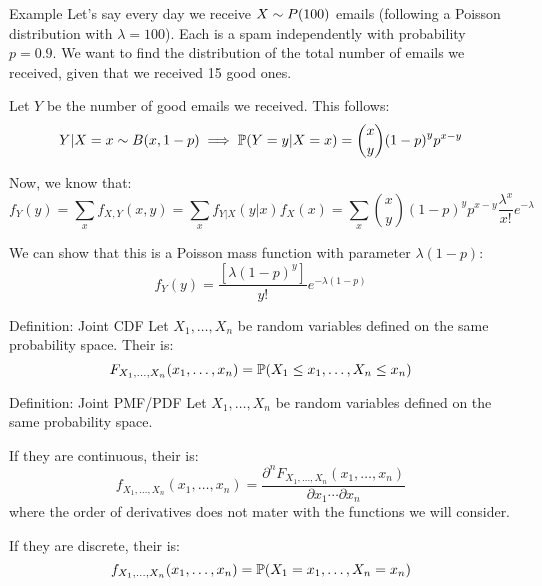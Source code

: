 \documentclass[a4paper]{article}
\begin{document}
\begin{parag}{Example}
    Let's say every day we receive $X \followsdistr P\left(100\right)$ emails (following a Poisson distribution with $\lambda = 100$). Each is a spam independently with probability $p = 0.9$. We want to find the distribution of the total number of emails we received, given that we received 15 good ones.

    Let $Y$ be the number of good emails we received. This follows: 
    \[Y | X = x \followsdistr B\left(x, 1-p\right) \implies \prob\left(Y = y | X = x\right) = \binom{x}{y} \left(1-p\right)^y p^{x-y}\]
    
    Now, we know that: 
    \[f_Y\left(y\right) = \sum_{x}^{} f_{X, Y}\left(x, y\right) = \sum_{x}^{} f_{Y|X}\left(y|x\right) f_X\left(x\right) = \sum_{x}^{} \binom{x}{y} \left(1-p\right)^y p^{x-y} \frac{\lambda^x}{x!} e^{-\lambda}\]

    We can show that this is a Poisson mass function with parameter $\lambda\left(1-p\right)$: 
    \[f_Y\left(y\right) = \frac{\left[\lambda\left(1-p\right)^y\right]}{y!} e^{-\lambda\left(1-p\right)}\]
\end{parag}

\begin{parag}{Definition: Joint CDF}
    Let $X_1, \ldots, X_n$ be random variables defined on the same probability space. Their  is: 
    \[F_{X_1, \ldots, X_n} \left(x_1, \ldots, x_n\right) = \prob\left(X_1 \leq x_1, \ldots, X_n \leq x_n\right)\]
\end{parag}

\begin{parag}{Definition: Joint PMF/PDF}
    Let $X_1, \ldots, X_n$ be random variables defined on the same probability space. 

    If they are continuous, their  is: 
    \[f_{X_1, \ldots, X_n}\left(x_1, \ldots, x_n\right) = \frac{\partial^n F_{X_1, \ldots, X_n}\left(x_1, \ldots, x_n\right)}{\partial x_1 \cdots \partial x_n}\]
    where the order of derivatives does not mater with the functions we will consider.

    If they are discrete, their  is: 
    \[f_{X_1, \ldots, X_n}\left(x_1, \ldots, x_n\right) = \prob\left(X_1 = x_1, \ldots, X_n = x_n\right)\]
\end{parag}
\end{document}
